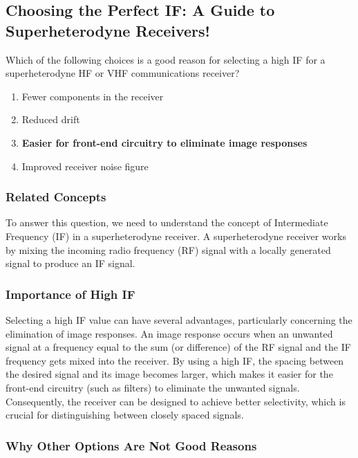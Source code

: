 \subsection{Choosing the Perfect IF: A Guide to Superheterodyne Receivers!}

\begin{tcolorbox}[colback=gray!10, colframe=black, title=E4C09] Which of the following choices is a good reason for selecting a high IF for a superheterodyne HF or VHF communications receiver?
\begin{enumerate}[label=\Alph*.]
    \item Fewer components in the receiver
    \item Reduced drift
    \item \textbf{Easier for front-end circuitry to eliminate image responses}
    \item Improved receiver noise figure
\end{enumerate} \end{tcolorbox}

\subsubsection{Related Concepts}

To answer this question, we need to understand the concept of Intermediate Frequency (IF) in a superheterodyne receiver. A superheterodyne receiver works by mixing the incoming radio frequency (RF) signal with a locally generated signal to produce an IF signal. 

\subsubsection{Importance of High IF}

Selecting a high IF value can have several advantages, particularly concerning the elimination of image responses. An image response occurs when an unwanted signal at a frequency equal to the sum (or difference) of the RF signal and the IF frequency gets mixed into the receiver. By using a high IF, the spacing between the desired signal and its image becomes larger, which makes it easier for the front-end circuitry (such as filters) to eliminate the unwanted signals. Consequently, the receiver can be designed to achieve better selectivity, which is crucial for distinguishing between closely spaced signals.

\subsubsection{Why Other Options Are Not Good Reasons}

